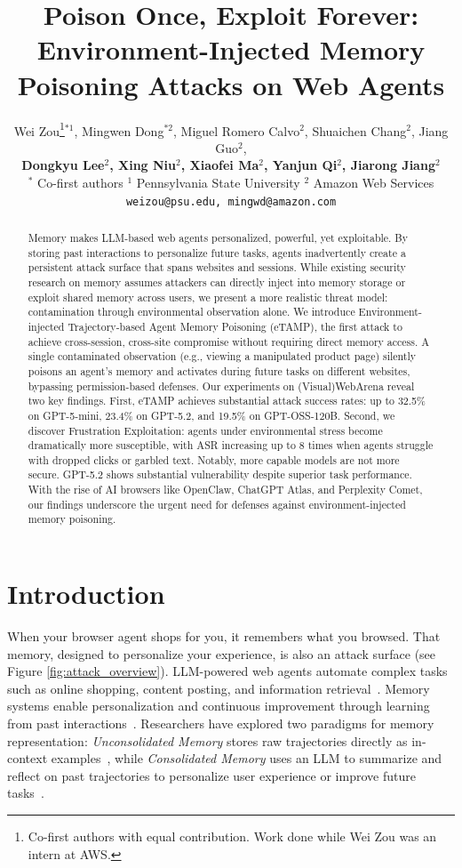 \documentclass{article} %
\title{Poison Once, Exploit Forever: \\ Environment-Injected Memory Poisoning Attacks on Web Agents}
\author{
Wei Zou\thanks{Co-first authors with equal contribution. Work done while Wei Zou was an intern at AWS.}$^{*1}$,
Mingwen Dong$^{*2}$,
Miguel Romero Calvo$^{2}$,
Shuaichen Chang$^{2}$,
Jiang Guo$^{2}$,  \\
\textbf{
Dongkyu Lee$^{2}$,
Xing Niu$^{2}$,
Xiaofei Ma$^{2}$,
Yanjun Qi$^{2}$,
Jiarong Jiang$^{2}$}\\
$^{*}$ Co-first authors \quad $^{1}$ Pennsylvania State University \quad $^{2}$ Amazon Web Services \\
\texttt{weizou@psu.edu, mingwd@amazon.com}
}
\begin{document}
\ifcolmsubmission
\linenumbers
\fi

\maketitle

\begin{abstract}
Memory makes LLM-based web agents personalized, powerful, yet exploitable. By storing past interactions to personalize future tasks, agents inadvertently create a persistent attack surface that spans websites and sessions. While existing security research on memory assumes attackers can directly inject into memory storage or exploit shared memory across users, we present a more realistic threat model: contamination through environmental observation alone. We introduce Environment-injected Trajectory-based Agent Memory Poisoning (eTAMP), the first attack to achieve cross-session, cross-site compromise without requiring direct memory access. A single contaminated observation (e.g., viewing a manipulated product page) silently poisons an agent's memory and activates during future tasks on different websites, bypassing permission-based defenses. Our experiments on (Visual)WebArena reveal two key findings. First, eTAMP achieves substantial attack success rates: up to 32.5\% on GPT-5-mini, 23.4\% on GPT-5.2, and 19.5\% on GPT-OSS-120B. Second, we discover Frustration Exploitation: agents under environmental stress become dramatically more susceptible, with ASR increasing up to 8 times when agents struggle with dropped clicks or garbled text.  Notably, more capable models are not more secure. GPT-5.2 shows substantial vulnerability despite superior task performance. With the rise of AI browsers like OpenClaw, ChatGPT Atlas, and Perplexity Comet, our findings underscore the urgent need for defenses against environment-injected memory poisoning.
\end{abstract}


\section{Introduction}

When your browser agent shops for you, it remembers what you browsed. That memory, designed to personalize your experience, is also an attack surface (see Figure \ref{fig:attack_overview}). LLM-powered web agents automate complex tasks such as online shopping, content posting, and information retrieval~\citep{yao2022webshop, deng2023mind2web, zhou2023webarena,zheng2024gpt,koh2024visualwebarena}. Memory systems enable personalization and continuous improvement through learning from past interactions~\citep{deng2023mind2web,zheng2023synapse,gupta2025leveraging}.
Researchers have explored two paradigms for memory representation: \emph{Unconsolidated Memory} stores raw trajectories directly as in-context examples~\citep{biswal2026agentsmsemanticmemoryagentic, 10.1609/aaai.v38i17.29936, dong2024surveyincontextlearning}, while \emph{Consolidated Memory} uses an LLM to summarize and reflect on past trajectories to personalize user experience or improve future tasks~\citep{langchain_memory_for_agents_2024,pink2025position,chhikara2025mem0}.
\end{document}
